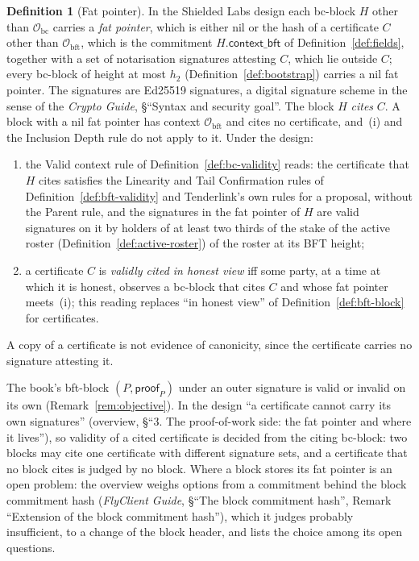 \documentclass[11pt,a4paper]{article}
\theoremstyle{definition}
\newtheorem{definition}[theorem]{Definition}
\newcommand{\bc}{\mathrm{bc}}
\newcommand{\bft}{\mathrm{bft}}
\newcommand{\Origin}{\mathcal{O}}
\newcommand{\Obc}{\Origin_{\bc}}
\newcommand{\Obft}{\Origin_{\bft}}
\newcommand{\proofsym}{\mathsf{proof}}
\newcommand{\contextbft}{\mathsf{context\_bft}}
\begin{document}
\begin{definition}[Fat pointer]\label{def:fat-pointer}
In the Shielded Labs design each bc-block $H$ other than $\Obc$ carries a
\emph{fat pointer}, which is either nil or the hash of a certificate $C$
other than $\Obft$, which is the commitment $H.\contextbft$ of
Definition~\ref{def:fields}, together with a set of notarisation signatures
attesting $C$, which lie outside $C$; every bc-block of height at most $h_2$
(Definition~\ref{def:bootstrap}) carries a nil fat pointer. The signatures
are Ed25519 signatures, a digital signature scheme in the sense of the
\emph{Crypto Guide}, \S``Syntax and security goal''. The block $H$
\emph{cites} $C$. A block with a nil fat pointer has context $\Obft$ and
cites no certificate, and~(i) and the Inclusion Depth rule do not apply to
it. Under the design:
\begin{enumerate}[label=(\roman*)]
\item the Valid context rule of Definition~\ref{def:bc-validity} reads: the
  certificate that $H$ cites satisfies the Linearity and Tail Confirmation
  rules of Definition~\ref{def:bft-validity} and Tenderlink's own rules for
  a proposal, without the Parent rule, and the signatures in the fat pointer
  of $H$ are valid signatures on it by holders of at least two thirds of the
  stake of the active roster (Definition~\ref{def:active-roster}) of the
  roster at its BFT height;
\item a certificate $C$ is \emph{validly cited in honest view} iff some
  party, at a time at which it is honest, observes a bc-block that cites
  $C$ and whose fat pointer meets~(i); this reading replaces ``in honest
  view'' of Definition~\ref{def:bft-block} for certificates.
\end{enumerate}
A copy of a certificate is not evidence of canonicity, since the
certificate carries no signature attesting it.
\end{definition}

The book's bft-block $(P, \proofsym_P)$ under an outer signature is valid
or invalid on its own (Remark~\ref{rem:objective}). In the design ``a
certificate cannot carry its own signatures'' (overview, \S``3. The
proof-of-work side: the fat pointer and where it lives''), so validity of a
cited certificate is decided from the citing bc-block: two blocks may cite
one certificate with different signature sets, and a certificate that no
block cites is judged by no block. Where a block stores its fat pointer
is an open problem: the overview weighs options from a commitment behind the
block commitment hash (\emph{FlyClient Guide}, \S``The block commitment hash'',
Remark ``Extension of the block commitment hash''), which it judges probably
insufficient, to a change of the block header, and lists the choice among its
open questions.
\end{document}

